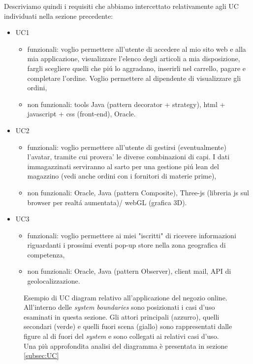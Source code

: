 \documentclass[12pt]{article}
\begin{document}
Descriviamo quindi i requisiti che abbiamo intercettato relativamente agli UC individuati nella sezione precedente: 
\begin{itemize}
	\item UC1
		\begin{itemize}
		\item funzionali: voglio permettere all'utente di accedere al mio sito web e alla mia applicazione, visualizzare l'elenco degli articoli a mia disposizione, fargli scegliere quelli che pi\'u lo aggradano, inserirli nel carrello, pagare e completare l'ordine. Voglio permettere al dipendente di visualizzare gli ordini, 
		\item non funzionali: tools Java (pattern decorator + strategy), html + javascript + css (front-end), Oracle. 
		\end{itemize}
	\item UC2
		\begin{itemize}
		\item funzionali: voglio permettere all'utente di gestirsi (eventualmente) l'avatar, tramite cui provera' le diverse combinazioni di capi. I dati immagazzinati serviranno al sarto per una gestione pi\'u lean del magazzino (vedi anche ordini con i fornitori di materie prime),
		\item non funzionali: Oracle, Java (pattern Composite), Three-js (libreria js sul browser per realt\'a aumentata)/ webGL (grafica 3D).
		\end{itemize}
	\item UC3
		\begin{itemize}
		\item funzionali: voglio permettere ai miei "iscritti" di ricevere informazioni riguardanti i prossimi eventi pop-up store nella zona geografica di competenza,
		\item non funzionali: Oracle, Java (pattern Observer), client mail, API di geolocalizzazione.
		\end{itemize}
\end{itemize}

\vspace{0.5cm}
\begin{figure}[t]
  \centering
   \makebox[\textwidth][c]{}
   \vspace{0.5cm}
  \caption{\small Esempio di UC diagram relativo all'applicazione del negozio online. All'interno delle {\em system boundaries} sono posizionati i casi d'uso esaminati in questa sezione. Gli attori principali (azzurro), quelli secondari (verde) e quelli fuori scena (giallo) sono rappresentati dalle figure al di fuori del {\em system} e sono collegati ai relativi casi d'uso. Una più approfondita analisi del diagramma è presentata in sezione \ref{subsec:UC}}
  \label{fig:UC_diagram}
\end{figure}
\end{document}
